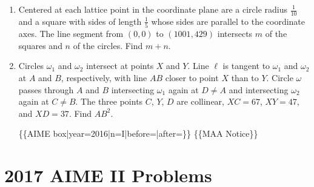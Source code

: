 \documentclass{article}
\begin{document}
\begin{enumerate}[label=\arabic*., itemsep=0.5em]
\vspace{0.5em}\item Centered at each lattice point in the coordinate plane are a circle radius \(\frac{1}{10}\) and a square with sides of length \(\frac{1}{5}\) whose sides are parallel to the coordinate axes. The line segment from \((0,0)\) to \((1001, 429)\) intersects \(m\) of the squares and \(n\) of the circles. Find \(m + n\).\par \vspace{0.5em}\item Circles \(\omega_1\) and \(\omega_2\) intersect at points \(X\) and \(Y\). Line \(\ell\) is tangent to \(\omega_1\) and \(\omega_2\) at \(A\) and \(B\), respectively, with line \(AB\) closer to point \(X\) than to \(Y\). Circle \(\omega\) passes through \(A\) and \(B\) intersecting \(\omega_1\) again at \(D \neq A\) and intersecting \(\omega_2\) again at \(C \neq B\). The three points \(C\), \(Y\), \(D\) are collinear, \(XC = 67\), \(XY = 47\), and \(XD = 37\). Find \(AB^2\).



\{\{AIME box|year=2016|n=I|before=|after=\}\}
\{\{MAA Notice\}\}\par \vspace{0.5em}
\end{enumerate}
\newpage\section*{2017 AIME II Problems}
\end{document}
